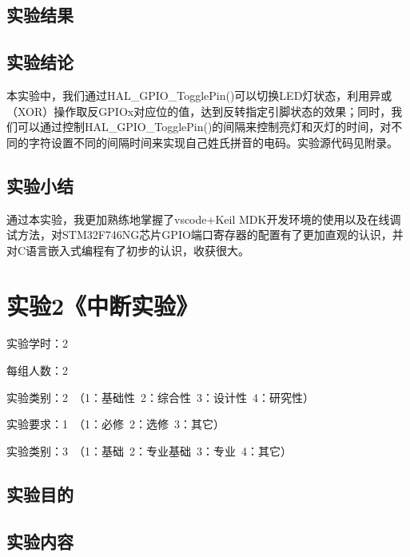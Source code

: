 ﻿\documentclass[UTF8,12pt]{article}
\begin{document}
\subsection{实验结果}

\subsection{实验结论}
本实验中，我们通过HAL\_GPIO\_TogglePin()可以切换LED灯状态，利用异或（XOR）操作取反GPIOx对应位的值，达到反转指定引脚状态的效果；同时，我们可以通过控制HAL\_GPIO\_TogglePin()的间隔来控制亮灯和灭灯的时间，对不同的字符设置不同的间隔时间来实现自己姓氏拼音的电码。实验源代码见附录。

\subsection{实验小结}
通过本实验，我更加熟练地掌握了vscode+Keil MDK开发环境的使用以及在线调试方法，对STM32F746NG芯片GPIO端口寄存器的配置有了更加直观的认识，并对C语言嵌入式编程有了初步的认识，收获很大。

\newpage


\section{实验2《中断实验》}

实验学时：2

每组人数：2

实验类别：2\ （1：基础性\ 2：综合性\ 3：设计性\ 4：研究性）

实验要求：1\ （1：必修\ 2：选修\ 3：其它）

实验类别：3\ （1：基础\ 2：专业基础\ 3：专业\ 4：其它）

\subsection{实验目的}

\subsection{实验内容}
\end{document}
